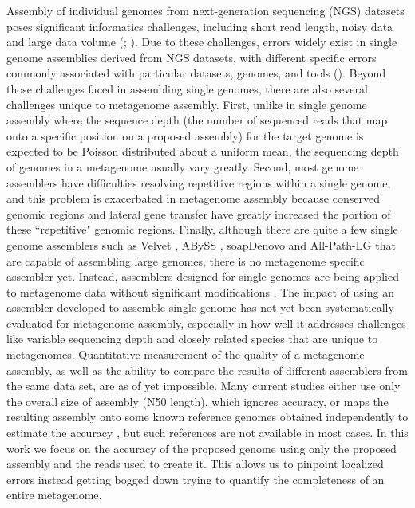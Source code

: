 \documentclass[phd,tocprelim]{cornell}
\begin{document}
Assembly of individual genomes from next-generation sequencing (NGS) datasets poses significant informatics challenges, including short read length, noisy data and large data volume (\cite{Lin2011}; \cite{Pop2009}). Due to these challenges, errors widely exist in single genome assemblies derived from NGS datasets, with different specific errors commonly associated with particular datasets, genomes, and tools (\cite{Haiminen2011}). Beyond those challenges faced in assembling single genomes, there are also several challenges unique to metagenome assembly. First, unlike in single genome assembly where the sequence depth (the number of sequenced reads that map onto a specific position on a proposed assembly) for the target genome is expected to be Poisson distributed about a uniform mean, the sequencing depth of genomes in a metagenome usually vary greatly. Second, most genome assemblers have difficulties resolving repetitive regions within a single genome, and this problem is exacerbated in metagenome assembly because conserved genomic regions and lateral gene transfer have greatly increased the portion of these ``repetitive" genomic regions. Finally, although there are quite a few single genome assemblers such as Velvet \cite{Zerbino2008}, ABySS \cite{Simpson2009}, soapDenovo \cite{Li2010} and All-Path-LG \cite{Gnerre2010} that are capable of assembling large genomes, there is no metagenome specific assembler yet. Instead, assemblers designed for single genomes are being applied to metagenome data without significant modifications \cite{Qin2010}\cite{Hess2011}. The impact of using an assembler developed to assemble single genome has not yet been systematically evaluated for metagenome assembly, especially in how well it addresses challenges like variable sequencing depth and closely related species that are unique to metagenomes. Quantitative measurement of the quality of a metagenome assembly, as well as the ability to compare the results of different assemblers from the same data set, are as of yet impossible. Many current studies either use only the overall size of assembly (N50 length), which ignores accuracy, or maps the resulting assembly onto some known reference genomes obtained independently to estimate the accuracy \cite{Hess2011}, but such references are not available in most cases. In this work we focus on the accuracy of the proposed genome using only the proposed assembly and the reads used to create it. This allows us to pinpoint localized errors instead getting bogged down trying to quantify the completeness of an entire metagenome.
\end{document}

